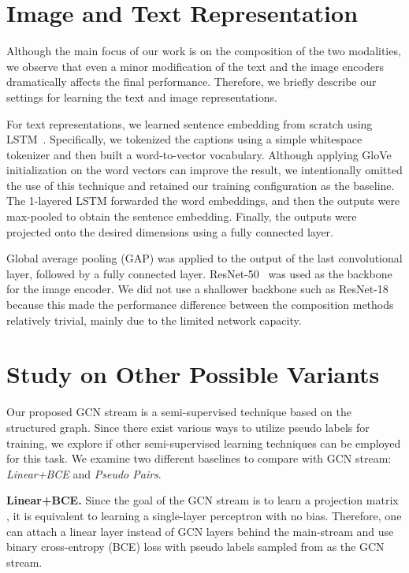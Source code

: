 \documentclass[10pt,twocolumn,letterpaper]{article}
\begin{document}
\section{Image and Text Representation}
Although the main focus of our work is on the composition of the two modalities, we observe that even a minor modification of the text and the image encoders dramatically affects the final performance. Therefore, we briefly describe our settings for learning the text and image representations.

For text representations, we learned sentence embedding from scratch using LSTM~\cite{hochreiter1997long}. Specifically, we tokenized the captions using a simple whitespace tokenizer and then built a word-to-vector vocabulary. Although applying GloVe~\cite{pennington2014glove} initialization on the word vectors can improve the result, we intentionally omitted the use of this technique and retained our training configuration as the baseline. The 1-layered LSTM forwarded the word embeddings, and then the outputs were max-pooled to obtain the sentence embedding. Finally, the outputs were projected onto the desired dimensions using a fully connected layer.

Global average pooling (GAP) was applied to the output of the last convolutional layer, followed by a fully connected layer. ResNet-50~\cite{he2016deep} was used as the backbone for the image encoder. We did not use a shallower backbone such as ResNet-18 because this made the performance difference between the composition methods relatively trivial, mainly due to the limited network capacity.

\section{Study on Other Possible Variants}
Our proposed GCN stream is a semi-supervised technique based on the structured graph. Since there exist various ways to utilize pseudo labels for training, we explore if other semi-supervised learning techniques can be employed for this task. We examine two different baselines to compare with GCN stream: \textit{Linear+BCE} and \textit{Pseudo Pairs}.

\noindent
\textbf{Linear+BCE.} Since the goal of the GCN stream is to learn a projection matrix , it is equivalent to learning a single-layer perceptron with no bias. Therefore, one can attach a linear layer instead of GCN layers behind the main-stream and use binary cross-entropy (BCE) loss with pseudo labels sampled from  as the GCN stream.
\end{document}

